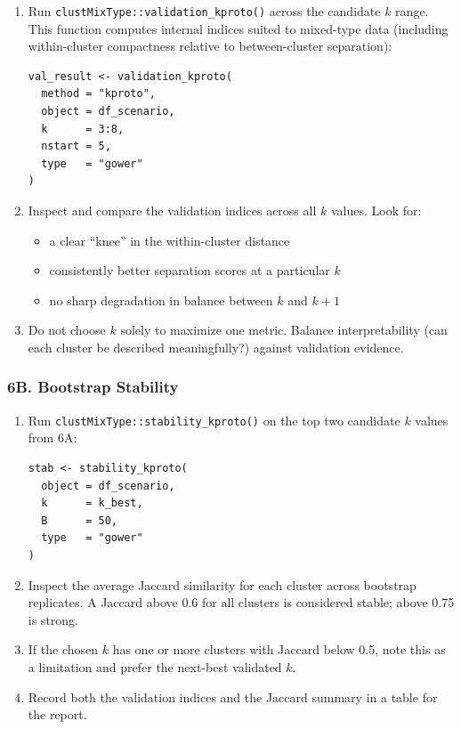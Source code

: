 \documentclass[11pt]{article}
\begin{document}
\begin{enumerate}
  \item Run \texttt{clustMixType::validation\_kproto()} across the candidate $k$ range. This function computes internal indices suited to mixed-type data (including within-cluster compactness relative to between-cluster separation):
  \begin{verbatim}
val_result <- validation_kproto(
  method = "kproto",
  object = df_scenario,
  k      = 3:8,
  nstart = 5,
  type   = "gower"
)
  \end{verbatim}

  \item Inspect and compare the validation indices across all $k$ values. Look for:
  \begin{itemize}
    \item a clear ``knee'' in the within-cluster distance
    \item consistently better separation scores at a particular $k$
    \item no sharp degradation in balance between $k$ and $k+1$
  \end{itemize}

  \item Do not choose $k$ solely to maximize one metric. Balance interpretability (can each cluster be described meaningfully?) against validation evidence.
\end{enumerate}

\subsubsection*{6B. Bootstrap Stability}

\begin{enumerate}
  \item Run \texttt{clustMixType::stability\_kproto()} on the top two candidate $k$ values from 6A:
  \begin{verbatim}
stab <- stability_kproto(
  object = df_scenario,
  k      = k_best,
  B      = 50,
  type   = "gower"
)
  \end{verbatim}

  \item Inspect the average Jaccard similarity for each cluster across bootstrap replicates. A Jaccard above 0.6 for all clusters is considered stable; above 0.75 is strong.

  \item If the chosen $k$ has one or more clusters with Jaccard below 0.5, note this as a limitation and prefer the next-best validated $k$.

  \item Record both the validation indices and the Jaccard summary in a table for the report.
\end{enumerate}
\end{document}
